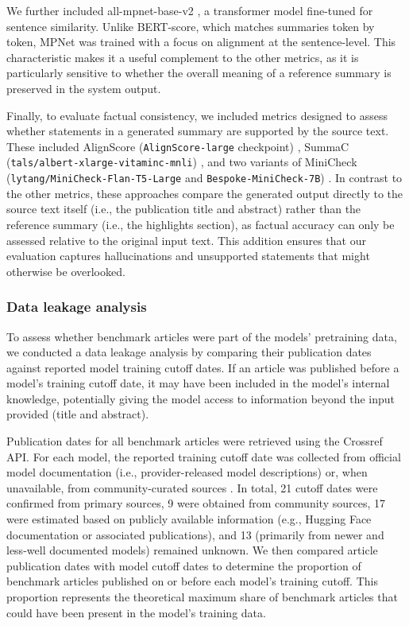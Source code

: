 We further included all-mpnet-base-v2 \cite{song2020mpnetmaskedpermutedpretraining}, a transformer model fine-tuned for sentence similarity. Unlike BERT-score, which matches summaries token by token, \ac{MPNet} was trained with a focus on alignment at the sentence-level. This characteristic makes it a useful complement to the other metrics, as it is particularly sensitive to whether the overall meaning of a reference summary is preserved in the system output.

Finally, to evaluate factual consistency, we included metrics designed to assess whether statements in a generated summary are supported by the source text. These included AlignScore (\texttt{AlignScore-large} checkpoint) \cite{zha2023alignscoreevaluatingfactualconsistency}, SummaC (\texttt{tals/albert-xlarge-vitaminc-mnli}) \cite{laban2021summacrevisitingnlibasedmodels}, and two variants of MiniCheck (\texttt{lytang/MiniCheck-Flan-T5-Large} and \texttt{Bespoke-MiniCheck-7B}) \cite{tang2024minicheckefficientfactcheckingllms}. In contrast to the other metrics, these approaches compare the generated output directly to the source text itself (i.e., the publication title and abstract) rather than the reference summary (i.e., the highlights section), as factual accuracy can only be assessed relative to the original input text. This addition ensures that our evaluation captures hallucinations and unsupported statements that might otherwise be overlooked.

\subsubsection{Data leakage analysis}

To assess whether benchmark articles were part of the models' pretraining data, we conducted a data leakage analysis by comparing their publication dates against reported model training cutoff dates. If an article was published before a model’s training cutoff date, it may have been included in the model’s internal knowledge, potentially giving the model access to information beyond the input provided (title and abstract).

Publication dates for all benchmark articles were retrieved using the Crossref API. For each model, the reported training cutoff date was collected from official model documentation (i.e., provider-released model descriptions) or, when unavailable, from community-curated sources \cite{LLMCutoffCommunity}. In total, 21 cutoff dates were confirmed from primary sources, 9 were obtained from community sources, 17 were estimated based on publicly available information (e.g., Hugging Face documentation or associated publications), and 13 (primarily from newer and less-well documented models) remained unknown. We then compared article publication dates with model cutoff dates to determine the proportion of benchmark articles published on or before each model’s training cutoff. This proportion represents the theoretical maximum share of benchmark articles that could have been present in the model’s training data.

